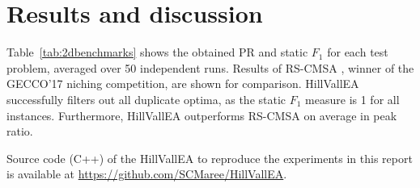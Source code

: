 \documentclass[10pt,a4paper, geometry, fullpage]{article}
\theoremstyle{plain}
\theoremstyle{remark}
\begin{document}
\section{Results and discussion}
Table~\ref{tab:2dbenchmarks} shows the obtained PR and static $F_1$ for each test problem, averaged over 50 independent runs. Results of RS-CMSA \cite{ahrari17}, winner of the GECCO'17 niching competition, are shown for comparison. HillVallEA successfully filters out all duplicate optima, as the static $F_1$ measure is 1 for all instances. Furthermore, HillVallEA outperforms RS-CMSA on average in peak ratio. 

Source code (C++) of the HillVallEA to reproduce the experiments in this report is available at \url{https://github.com/SCMaree/HillVallEA}.

{\small


}
\end{document}
